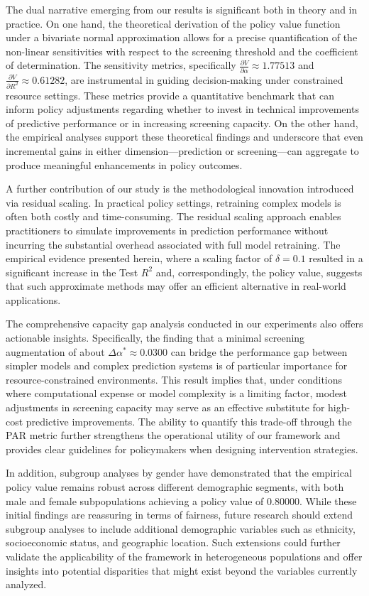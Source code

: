 \documentclass{article} %
\begin{document}
The dual narrative emerging from our results is significant both in theory and in practice. On one hand, the theoretical derivation of the policy value function under a bivariate normal approximation allows for a precise quantification of the non-linear sensitivities with respect to the screening threshold and the coefficient of determination. The sensitivity metrics, specifically \(\frac{\partial V}{\partial \alpha}\approx 1.77513\) and \(\frac{\partial V}{\partial R^2}\approx 0.61282\), are instrumental in guiding decision-making under constrained resource settings. These metrics provide a quantitative benchmark that can inform policy adjustments regarding whether to invest in technical improvements of predictive performance or in increasing screening capacity. On the other hand, the empirical analyses support these theoretical findings and underscore that even incremental gains in either dimension—prediction or screening—can aggregate to produce meaningful enhancements in policy outcomes.

A further contribution of our study is the methodological innovation introduced via residual scaling. In practical policy settings, retraining complex models is often both costly and time-consuming. The residual scaling approach enables practitioners to simulate improvements in prediction performance without incurring the substantial overhead associated with full model retraining. The empirical evidence presented herein, where a scaling factor of \(\delta=0.1\) resulted in a significant increase in the Test \(R^2\) and, correspondingly, the policy value, suggests that such approximate methods may offer an efficient alternative in real-world applications.

The comprehensive capacity gap analysis conducted in our experiments also offers actionable insights. Specifically, the finding that a minimal screening augmentation of about \(\Delta\alpha^* \approx 0.0300\) can bridge the performance gap between simpler models and complex prediction systems is of particular importance for resource-constrained environments. This result implies that, under conditions where computational expense or model complexity is a limiting factor, modest adjustments in screening capacity may serve as an effective substitute for high-cost predictive improvements. The ability to quantify this trade-off through the PAR metric further strengthens the operational utility of our framework and provides clear guidelines for policymakers when designing intervention strategies.

In addition, subgroup analyses by gender have demonstrated that the empirical policy value remains robust across different demographic segments, with both male and female subpopulations achieving a policy value of 0.80000. While these initial findings are reassuring in terms of fairness, future research should extend subgroup analyses to include additional demographic variables such as ethnicity, socioeconomic status, and geographic location. Such extensions could further validate the applicability of the framework in heterogeneous populations and offer insights into potential disparities that might exist beyond the variables currently analyzed.
\end{document}
